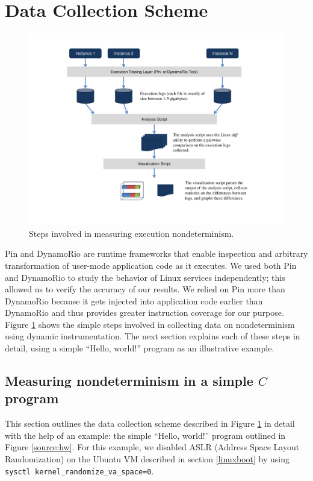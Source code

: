 \section{Data Collection Scheme} \label{datacollection}
\begin{figure}[h]
  \center
  \includegraphics[width=1.0\textwidth, trim=1cm 1cm 1cm 1cm]
                  {naivedatacollection.pdf}
  \caption[Steps involved in measuring execution nondeterminism]%
  {Steps involved in measuring execution nondeterminism.}
  \label{data:naive}
\end{figure}

Pin and DynamoRio are runtime frameworks that enable inspection
and arbitrary transformation of user-mode application code as it executes.
We used both Pin and DynamoRio to study the behavior
of Linux services independently; this allowed us to verify
the accuracy of our results. We relied on Pin more 
than DynamoRio because it gets injected into application code
earlier than DynamoRio and thus provides greater
instruction coverage for our purpose.  Figure \ref{data:naive} shows the simple steps involved
in collecting data on nondeterminism using
dynamic instrumentation. The next section 
explains each of these steps in detail, 
using a simple ``Hello, world!'' program as an illustrative example.

\subsection{Measuring nondeterminism in a simple $C$ program} \label{ch:hw}
This section outlines the data collection scheme
described in Figure \ref{data:naive} in detail with the help
of an example:  the simple ``Hello, world!'' program
outlined in Figure \ref{source:hw}.
For this example, we disabled ASLR (Address Space Layout
Randomization) on the Ubuntu VM described in section \ref{linuxboot}
by using \texttt{sysctl kernel\_randomize\_va\_space=0}. \newline

